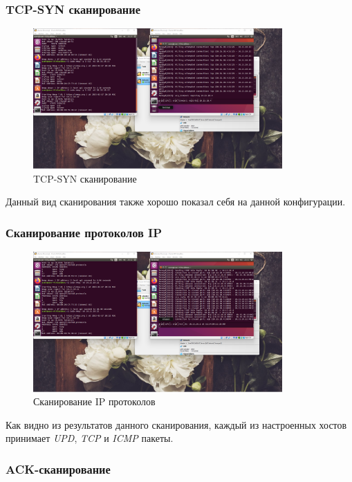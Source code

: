\documentclass[a4paper]{article}
\begin{document}
  \subsubsection{TCP-SYN сканирование}

  \begin{figure}[H]
    \centering
    \includegraphics[width=0.85\textwidth]{01_00 (28)}
    \caption{TCP-SYN сканирование}
  \end{figure}

  Данный вид сканирования также хорошо показал себя на данной конфигурации.

  \subsubsection{Сканирование протоколов IP}

  \begin{figure}[H]
    \centering
    \includegraphics[width=0.85\textwidth]{01_00 (29)}
    \caption{Сканирование IP протоколов}
  \end{figure}

  Как видно из результатов данного сканирования, каждый из настроенных
  хостов принимает \textit{UPD}, \textit{TCP} и \textit{ICMP} пакеты.

  \subsubsection{ACK-сканирование}
\end{document}
